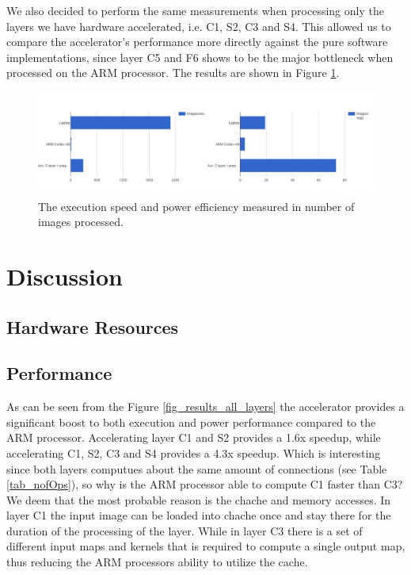We also decided to perform the same measurements when processing only the layers we have hardware accelerated, i.e. C1, S2, C3 and S4. This allowed us to compare the accelerator's performance more directly against the pure software implementations, since layer C5 and F6 shows to be the major bottleneck when processed on the ARM processor. The results are shown in Figure \ref{fig_results_accelerated_layers}.


\begin{figure}[h!]
	\centering
	\includegraphics[width=1.0\textwidth]{Figures/Results/results_accelerated_layers}
	\caption{The execution speed and power efficiency measured in number of images processed.}
	\label{fig_results_accelerated_layers}
\end{figure}

\section{Discussion} \label{sec_discussion}

\subsection{Hardware Resources}

\subsection{Performance} 

As can be seen from the Figure \ref{fig_results_all_layers} the accelerator provides a significant boost to both execution and power performance compared to the ARM processor. Accelerating layer C1 and S2 provides a 1.6x speedup, while accelerating C1, S2, C3 and S4 provides a 4.3x speedup. Which is interesting since both layers computues about the same amount of connections (see Table \ref{tab_nofOps}), so why is the ARM processor able to compute C1 faster than C3? We deem that the most probable reason is the chache and memory accesses. In layer C1 the input image can be loaded into chache once and stay there for the duration of the processing of the layer. While in layer C3 there is a set of different input maps and kernels that is required to compute a single output map, thus reducing the ARM processors ability to utilize the cache. 

